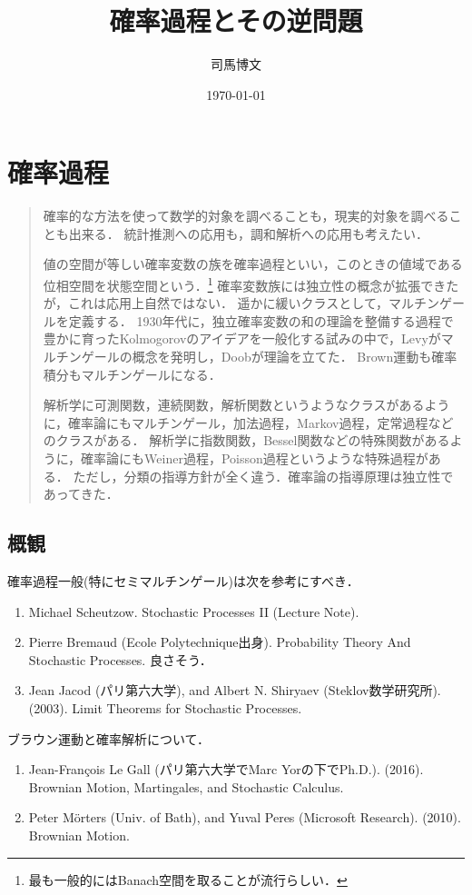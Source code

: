 \documentclass[uplatex,dvipdfmx]{jsreport}
\title{確率過程とその逆問題}
\author{司馬博文}
\date{\today}
\begin{document}
\tableofcontents

\chapter{確率過程}

\begin{quotation}
    確率的な方法を使って数学的対象を調べることも，現実的対象を調べることも出来る．
    統計推測への応用も，調和解析への応用も考えたい．

    値の空間が等しい確率変数の族を確率過程といい，このときの値域である位相空間を状態空間という．\footnote{最も一般的にはBanach空間を取ることが流行らしい．}
    確率変数族には独立性の概念が拡張できたが，これは応用上自然ではない．
    遥かに緩いクラスとして，マルチンゲールを定義する．
    1930年代に，独立確率変数の和の理論を整備する過程で豊かに育ったKolmogorovのアイデアを一般化する試みの中で，Levyがマルチンゲールの概念を発明し，Doobが理論を立てた．
    Brown運動も確率積分もマルチンゲールになる．

    解析学に可測関数，連続関数，解析関数というようなクラスがあるように，確率論にもマルチンゲール，加法過程，Markov過程，定常過程などのクラスがある．
    解析学に指数関数，Bessel関数などの特殊関数があるように，確率論にもWeiner過程，Poisson過程というような特殊過程がある．
    ただし，分類の指導方針が全く違う．確率論の指導原理は独立性であってきた．
\end{quotation}

\section{概観}

\begin{history}
    確率過程一般(特にセミマルチンゲール)は次を参考にすべき．
    \begin{enumerate}[({SP}1)]
        \item Michael Scheutzow. Stochastic Processes II (Lecture Note).
        \item Pierre Bremaud (Ecole Polytechnique出身). Probability Theory And Stochastic Processes. 良さそう．
        \item Jean Jacod (パリ第六大学), and Albert N. Shiryaev (Steklov数学研究所). (2003). Limit Theorems for Stochastic Processes.
    \end{enumerate}
    ブラウン運動と確率解析について．
    \begin{enumerate}[({B}1)]
        \item Jean-François Le Gall (パリ第六大学でMarc Yorの下でPh.D.). (2016). Brownian Motion, Martingales, and Stochastic Calculus.
        \item Peter Mörters (Univ. of Bath), and Yuval Peres (Microsoft Research). (2010). Brownian Motion.
    \end{enumerate}
\end{history}
\end{document}
